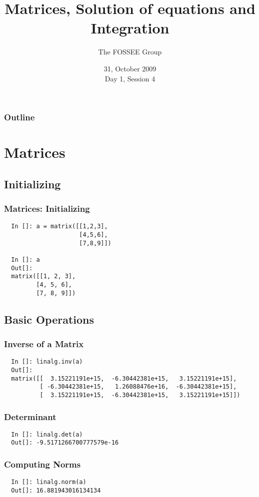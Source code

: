 \documentclass[14pt,compress]{beamer}
\title[Basic Python]{Matrices, Solution of equations and Integration\\}
\author[FOSEE Team] {The FOSSEE Group}
\institute[IIT Bombay] {Department of Aerospace Engineering\\IIT Bombay}
\date[] {31, October 2009\\Day 1, Session 4}
\begin{document}
\begin{frame}
  \titlepage
\end{frame}

\begin{frame}
  \frametitle{Outline}
  \tableofcontents
\end{frame}

\section{Matrices}
\subsection{Initializing}
\begin{frame}[fragile]
\frametitle{Matrices: Initializing}
\begin{lstlisting}
  In []: a = matrix([[1,2,3],
                     [4,5,6],
                     [7,8,9]])

  In []: a
  Out[]: 
  matrix([[1, 2, 3],
         [4, 5, 6],
         [7, 8, 9]])
\end{lstlisting}
\end{frame}

\subsection{Basic Operations}
\begin{frame}[fragile]
\frametitle{Inverse of a Matrix}
\begin{small}
\begin{lstlisting}
  In []: linalg.inv(a)
  Out[]: 
  matrix([[  3.15221191e+15,  -6.30442381e+15,   3.15221191e+15],
          [ -6.30442381e+15,   1.26088476e+16,  -6.30442381e+15],
          [  3.15221191e+15,  -6.30442381e+15,   3.15221191e+15]])
\end{lstlisting}
\end{small}
\end{frame}

\begin{frame}[fragile]
\frametitle{Determinant}
\begin{lstlisting}
  In []: linalg.det(a)
  Out[]: -9.5171266700777579e-16
\end{lstlisting}
\end{frame}

\begin{frame}[fragile]
\frametitle{Computing Norms}
\begin{lstlisting}
  In []: linalg.norm(a)
  Out[]: 16.881943016134134
\end{lstlisting}
\end{frame}
\end{document}
